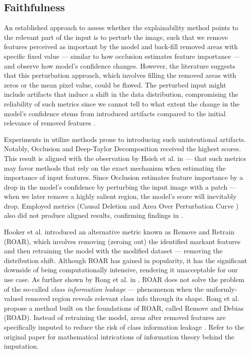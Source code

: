 \subsection*{Faithfulness}

An established approach to assess whether the explainability method points to the relevant part of the input is to perturb the image, such that we remove features perceived as important by the model and back-fill removed areas with specific fixed value --- similar to how occlusion estimates feature importance --- and observe how model's confidence changes.
However, the literature suggests that this perturbation approach, which involves filling the removed areas with zeros or the mean pixel value, could be flawed.
The perturbed input might include artifacts that induce a shift in the data distribution, compromising the reliability of such metrics since we cannot tell to what extent the change in the model's confidence stems from introduced artifacts compared to the initial relevance of removed features \cite{roar}.

Experiments in \cite{gallo} utilize methods prone to introducing such unintentional artifacts.
Notably, Occlusion and Deep-Taylor Decomposition \cite{xai-dtd} received the highest scores.
This result is aligned with the observation by Hsieh et al. in \cite{xai-hsieh-occ-dtd} --- that such metrics may favor methods that rely on the exact mechanism when estimating the importance of input features.
Since Occlusion estimates feature importance by a drop in the model's confidence by perturbing the input image with a patch --- when we later remove a highly salient region, the model's score will inevitably drop.
Employed metrics (Causal Deletion \cite{xai-causal-deletion} and Area Over Perturbation Curve \cite{xai-aopc}) also did not produce aligned results, confirming findings in \cite{roar}.

Hooker et al. \cite{roar} introduced an alternative metric known as Remove and Retrain (ROAR), which involves removing (zeroing out) the identified markant features and then retraining the model with the modified dataset --- removing the distribution shift.
Although ROAR has gained in popularity, it has the significant downside of being computationally intensive, rendering it unacceptable for our use case.
As further shown by Rong et al. in \cite{road}, ROAR does not solve the problem of the so-called \emph{class information leakage} --- phenomenon when the uniformly-valued removed region reveals relevant class info through its shape.
Rong et al. propose a method built on the foundations of ROAR, called Remove and Debias (ROAD).
Instead of retraining the model, areas after removed features are specifically imputed to reduce the risk of class information leakage \cite{road}. Refer to the original paper for mathematical intrications of information theory behind the imputation.


